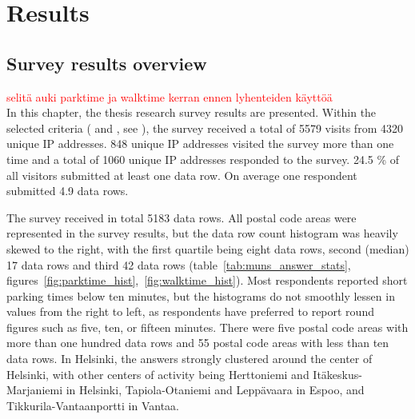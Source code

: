 \section{Results}
\label{sec:c4-results} %
\subsection{Survey results overview}
\justify

\textcolor{red}{selitä auki parktime ja walktime kerran ennen lyhenteiden käyttöä}\\
In this chapter, the thesis research survey results are presented. Within the selected criteria ( and , see \hyperref[sec:c3-processdata]{}), the survey received a total of 5579 visits from 4320 unique IP addresses. 848 unique IP addresses visited the survey more than one time and a total of 1060 unique IP addresses responded to the survey. 24.5 \% of all visitors submitted at least one data row. On average one respondent submitted 4.9 data rows.

The survey received in total 5183 data rows. All postal code areas were represented in the survey results, but the data row count histogram was heavily skewed to the right, with the first quartile being eight data rows, second (median) 17 data rows and third 42 data rows (table~\ref{tab:muns_answer_stats}, figures~\ref{fig:parktime_hist},~\ref{fig:walktime_hist}). Most respondents reported short parking times below ten minutes, but the histograms do not smoothly lessen in values from the right to left, as respondents have preferred to report round figures such as five, ten, or fifteen minutes. There were five postal code areas with more than one hundred data rows and 55 postal code areas with less than ten data rows. In Helsinki, the answers strongly clustered around the center of Helsinki, with other centers of activity being Herttoniemi and Itäkeskus-Marjaniemi in Helsinki, Tapiola-Otaniemi and Leppävaara in Espoo, and Tikkurila-Vantaanportti in Vantaa.


